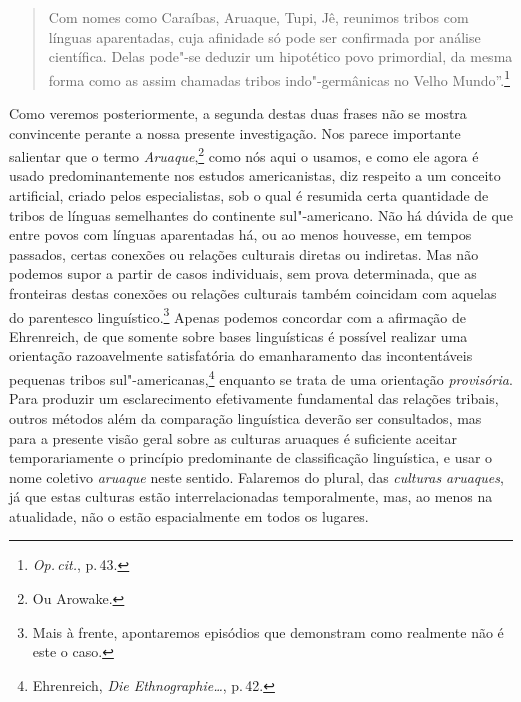 \begin{quote}
Com nomes como Caraíbas, Aruaque, Tupi,
Jê, reunimos tribos com línguas aparentadas, cuja afinidade só pode ser
confirmada por análise científica. Delas pode"-se deduzir um hipotético
povo primordial, da mesma forma como as assim chamadas tribos
indo"-germânicas no Velho Mundo''.\footnote{\textit{Op.\,cit.}, p.\,43.}
\end{quote}

Como veremos posteriormente, a segunda destas duas frases não se
mostra convincente perante a nossa presente investigação. Nos parece
importante salientar que o termo \textit{Aruaque},\footnote{Ou Arowake.} como nós aqui o usamos, 
e como ele agora é usado predominantemente nos
estudos americanistas, diz respeito a um conceito artificial, criado
pelos especialistas, sob o qual é resumida certa quantidade de tribos
de línguas semelhantes do continente sul"-americano. Não há dúvida de que
entre povos com línguas aparentadas há, ou ao menos houvesse, em tempos
passados, certas conexões ou relações culturais diretas ou indiretas.
Mas não podemos supor a partir de casos individuais, sem prova
determinada, que as fronteiras destas conexões ou relações culturais
também coincidam com aquelas do parentesco linguístico.\footnote{Mais à frente, apontaremos episódios
que demonstram como realmente não é este o caso.} Apenas podemos
concordar com a afirmação de Ehrenreich, de que somente sobre bases
linguísticas é possível realizar uma orientação razoavelmente
satisfatória do emanharamento das incontentáveis pequenas tribos
sul"-americanas,\footnote{Ehrenreich, \textit{Die Ethnographie\ldots}, p.\,42.} enquanto se trata de uma
orientação \textit{provisória}. Para produzir um esclarecimento
efetivamente fundamental das relações tribais, outros métodos além da
comparação linguística deverão ser consultados, mas para a presente
visão geral sobre as culturas aruaques é suficiente aceitar
temporariamente o princípio predominante de classificação linguística, 
e usar o nome coletivo \textit{aruaque} neste
sentido. Falaremos do plural, das \textit{culturas aruaques}, já que estas
culturas estão interrelacionadas temporalmente, mas, ao menos na
atualidade, não o estão espacialmente em todos os lugares.

